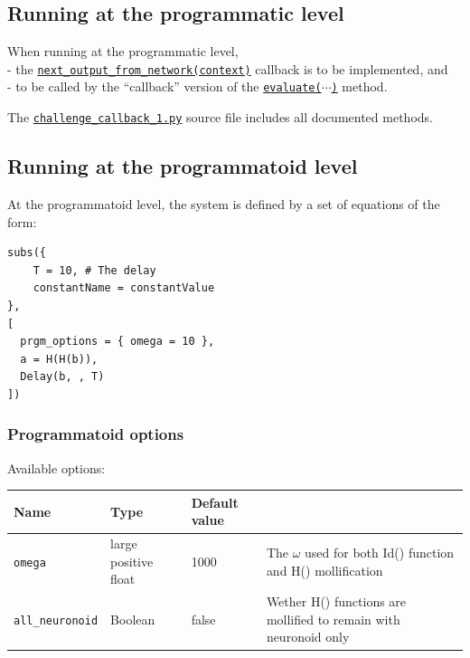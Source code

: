 \documentclass[a4]{article}
\begin{document}
\subsection{Running at the programmatic level}

When running at the programmatic level,
\\- the \href{https://html-preview.github.io/?url=https://github.com/vthierry/braincraft/blob/master/doc/api/challenge_callback.html#next_output_from_network}{{\tt  next\_output\_from\_network(context)}} callback is to be implemented, and
\\- to be called by the ``callback'' version of the \href{https://html-preview.github.io/?url=https://github.com/vthierry/braincraft/blob/master/doc/api/challenge_callback.html#evaluate}{{\tt evaluate($\cdots$)}} method.

The \href{https://github.com/vthierry/braincraft/blob/master/braincraft/challenge_callback.py}{{\tt challenge\_callback\_1.py}} source file includes all documented methods.
  
\subsection{Running at the programmatoid level}

At the programmatoid level, the system is defined by a set of equations of the form: \begin{verbatim}
subs({
    T = 10, # The delay
    constantName = constantValue
},
[
  prgm_options = { omega = 10 },
  a = H(H(b)),
  Delay(b, , T)
])\end{verbatim}

\subsubsection{Programmatoid options}

Available options: \\\begin{tabular}{|l|l|l|l|} \hline
{\bf Name}                & {\bf Type}                & {\bf Default value} & \\ \hline
{\tt omega}                & large positive float & 1000 & The $\omega$ used for both Id() function and H() mollification \\
{\tt all\_neuronoid}   & Boolean                   &  false & Wether H() functions are mollified to remain with neuronoid only \\
\hline \end{tabular}
\end{document}
